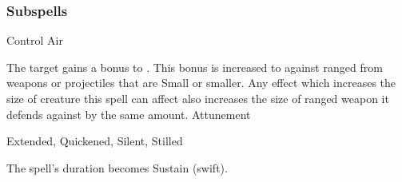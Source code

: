 \subsubsection{Subspells}
\begin{spellsection}{Control Air}
\begin{spellheader}
\end{spellheader}
\begin{spellcontent}
\begin{spelltargetinginfo}
\end{spelltargetinginfo}
\begin{spelleffects}
\spelleffect
The target gains a  bonus to .
This bonus is increased to  against ranged  from weapons or projectiles that are Small or smaller.
Any effect which increases the size of creature this spell can affect also increases the size of ranged weapon it defends against by the same amount.
\spelldur Attunement
\end{spelleffects}
\end{spellcontent}
\begin{spellfooter}
 Extended, Quickened, Silent, Stilled
\end{spellfooter}
\begin{spellsubcontent}
\begin{spellcantrip}
The spell's duration becomes Sustain (swift).
\end{spellcantrip}
\end{spellsubcontent}
\end{spellsection}
